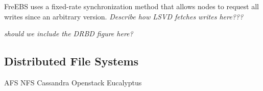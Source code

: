 FreEBS uses a fixed-rate synchronization method that allows nodes to request 
all writes since an arbitrary version. \emph{Describe how LSVD fetches 
writes here???}

\emph{should we include the DRBD figure here?}

\subsection{Distributed File Systems}
AFS
NFS
Cassandra
Openstack
Eucalyptus
